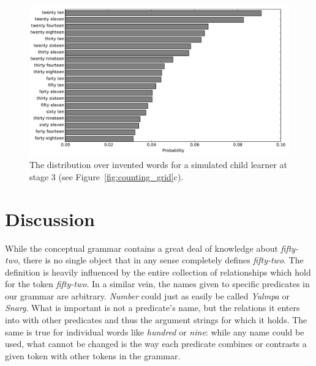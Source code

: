 \documentclass[10pt,letterpaper]{article}
\begin{document}
\begin{figure}[t]
\includegraphics[width=0.9\linewidth]{figures/inventedWords}
\caption{The distribution over invented words for a simulated child
  learner at stage
  3 (see Figure~\ref{fig:counting_grid}c). \label{fig:inventedWords}}
\end{figure}


\section{Discussion}




While the conceptual grammar contains a great deal of knowledge about
\emph{fifty-two}, there is no single object that in any sense
completely defines \emph{fifty-two}. The definition is heavily
influenced by the entire collection of relationships which hold for
the token \emph{fifty-two}. In a similar vein, the names given to
specific predicates in our grammar are arbitrary. \emph{Number} could
just as easily be called \emph{Yulmpa} or \emph{Snarg}. What is
important is not a predicate's name, but the relations it enters into
with other predicates and thus the argument strings for which it
holds. The same is true for individual words like \emph{hundred} or
\emph{nine}: while any name could be used, what cannot be changed is
the way each predicate combines or contrasts a given token with other
tokens in the grammar.
\end{document}
